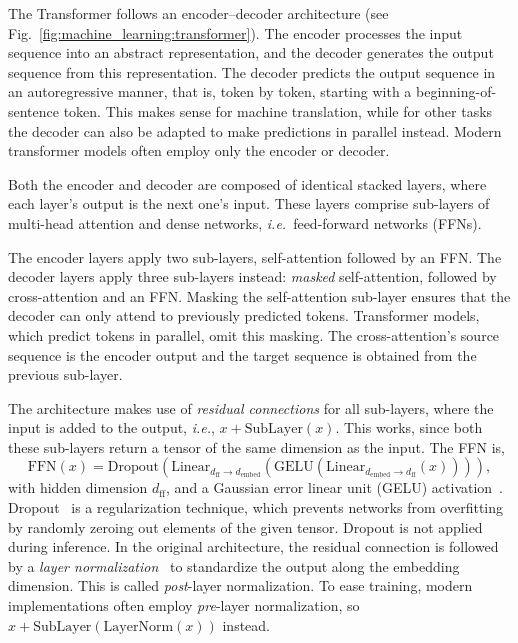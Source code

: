 The Transformer follows an encoder--decoder architecture (see Fig.~\ref{fig:machine_learning:transformer}). The encoder processes the input sequence into an abstract representation, and the decoder  generates the output sequence from this representation. 
The decoder predicts the output sequence in an autoregressive manner, that is, token by token, starting with a beginning-of-sentence token. This makes sense for machine translation, while for other tasks the decoder can also be adapted to make predictions in parallel instead.
Modern transformer models often employ only the encoder or decoder.

Both the encoder and decoder are composed of identical stacked layers, where each layer's output is the next one's input. These layers comprise sub-layers of multi-head attention and dense networks, \emph{i.e.}\ feed-forward networks (FFNs). 

The encoder layers apply two sub-layers, self-attention followed by an FFN. The decoder layers apply three sub-layers instead: \emph{masked} self-attention, followed by cross-attention and an FFN. Masking the self-attention sub-layer ensures that the decoder can only attend to previously predicted tokens. Transformer models, which predict tokens in parallel, omit this masking. The cross-attention's source sequence is the encoder output and the target sequence is obtained from the previous sub-layer.

The architecture makes use of \emph{residual connections} for all  sub-layers, where the input is added to the output, \emph{i.e.}, $x + \text{SubLayer}(x)$. This works, since both these sub-layers return a tensor of the same dimension as the input. The FFN is,
\begin{equation}
	\text{FFN}(x) = \text{Dropout}(\text{Linear}_{d_\text{ff} \rightarrow d_\text{embed}}(\text{GELU}(\text{Linear}_{d_\text{embed} \rightarrow d_\text{ff}}(x)))),
\end{equation}
with hidden dimension $d_\text{ff}$, and a Gaussian error linear unit (GELU) activation~\cite{hendrycks2017bridging}.
Dropout~\cite{JMLR:v15:srivastava14a} is a regularization technique, which prevents networks from overfitting by randomly zeroing out elements of the given tensor. Dropout is not applied during inference.
In the original architecture, the residual connection is followed by a \emph{layer normalization}~\cite{ba2016layernormalization} to standardize the output along the embedding dimension.
This is called \emph{post}-layer normalization. To ease training, modern implementations often employ \emph{pre}-layer normalization, so $x + \text{SubLayer}(\text{LayerNorm}(x))$ instead. 

